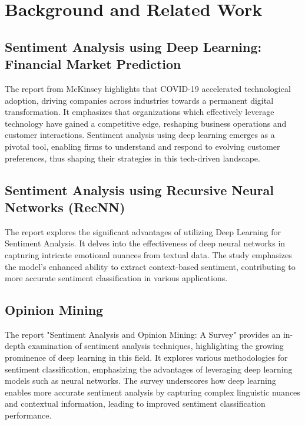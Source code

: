 \section{Background and Related Work}

\subsection{Sentiment Analysis using Deep Learning: Financial Market Prediction \cite{mckinsey}} %
\vspace{-1em}
The report from McKinsey highlights that COVID-19 accelerated technological adoption, driving companies across industries towards a permanent digital transformation. It emphasizes that organizations which effectively leverage technology have gained a competitive edge, reshaping business operations and customer interactions. Sentiment analysis using deep learning emerges as a pivotal tool, enabling firms to understand and respond to evolving customer preferences, thus shaping their strategies in this tech-driven landscape.
\vspace{-1em}
\subsection{Sentiment Analysis using Recursive Neural Networks (RecNN) \cite{background1}} 
\vspace{-1em}
The report explores the significant advantages of utilizing Deep Learning for Sentiment Analysis. It delves into the effectiveness of deep neural networks in capturing intricate emotional nuances from textual data. The study emphasizes the model's enhanced ability to extract context-based sentiment, contributing to more accurate sentiment classification in various applications.
\vspace{-1em}
\subsection{Opinion Mining \cite{background2}}
\vspace{-1em}
The report "Sentiment Analysis and Opinion Mining: A Survey" provides an in-depth examination of sentiment analysis techniques, highlighting the growing prominence of deep learning in this field. It explores various methodologies for sentiment classification, emphasizing the advantages of leveraging deep learning models such as neural networks. The survey underscores how deep learning enables more accurate sentiment analysis by capturing complex linguistic nuances and contextual information, leading to improved sentiment classification performance.
\vspace{-1em}
